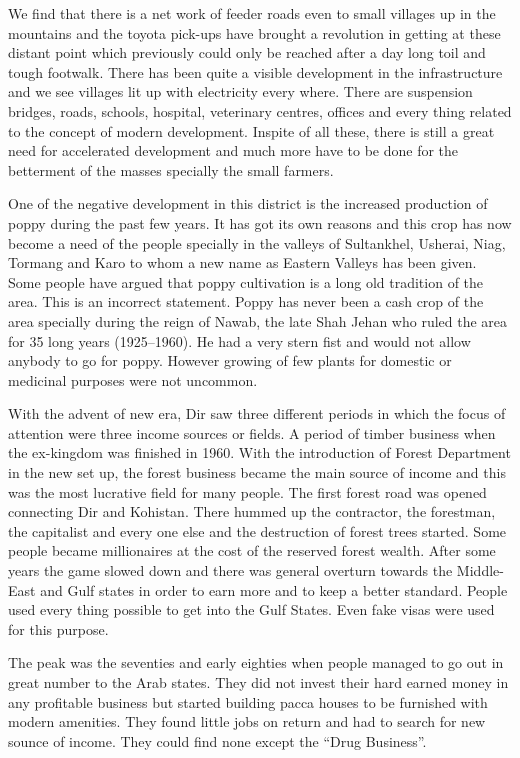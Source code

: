 \documentclass[twoside,openright]{book}
\begin{document}
We find that there is a net work of feeder roads even to small villages up in
the mountains and the toyota pick-ups have brought a revolution in getting at
these distant point which previously could only be reached after a day long toil
and tough footwalk. There has been quite a visible development in the
infrastructure and we see villages lit up with electricity every where. There
are suspension bridges, roads, schools, hospital, veterinary centres, offices
and every thing related to the concept of modern development. Inspite of all
these, there is still a great need for accelerated development and much more
have to be done for the betterment of the masses specially the small farmers.

One of the negative development in this district is the increased production of
poppy during the past few years. It has got its own reasons and this crop has
now become a need of the people specially in the valleys of Sultankhel, Usherai,
Niag, Tormang and Karo to whom a new name as Eastern Valleys has been given.
Some people have argued that poppy cultivation is a long old tradition of the
area. This is an incorrect statement. Poppy has never been a cash crop of the
area specially during the reign of Nawab, the late Shah Jehan who ruled the area
for 35 long years (1925--1960). He had a very stern fist and would not allow
anybody to go for poppy. However growing of few plants for domestic or medicinal
purposes were not uncommon.

With the advent of new era, Dir saw three different periods in which the focus
of attention were three income sources or fields. A period of timber business
when the  ex-kingdom was finished in 1960. With the introduction of Forest
Department in the  new set up, the forest business became the main source of
income and this was the most lucrative field for many people. The  first forest
road was opened connecting Dir and Kohistan. There hummed up the contractor, the
forestman, the capitalist and every one else and the destruction of forest trees
started. Some people became  millionaires at the cost of the reserved forest
wealth. After some years the game slowed down and there was general overturn
towards the Middle-East and Gulf states in order to earn more and to keep a
better standard. People used every thing possible to get into the Gulf States.
Even fake visas were used for this purpose.

The peak was the seventies and early eighties when people managed to go out in
great number to the Arab states. They did not invest their hard earned money in
any profitable business but started building pacca houses to be furnished with
modern amenities. They found little jobs on return and had to search for new
sounce of income. They could find none except the ``Drug Business''.
\end{document}
